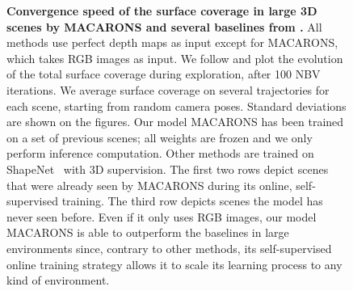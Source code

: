 \begin{figure}
  \caption{{\bf Convergence speed of the surface coverage in large 3D scenes by MACARONS and several baselines from \cite{guedon-nips22-scone-surface-coverage}.} All methods use perfect depth maps as input except for MACARONS, which takes RGB images as input. We follow \cite{guedon-nips22-scone-surface-coverage} and plot the evolution of the total surface coverage during exploration, after 100 NBV iterations. We average surface coverage on several trajectories for each scene, starting from random camera poses. Standard deviations are shown on the figures. Our model MACARONS has been trained on a set of previous scenes; all weights are frozen and we only perform inference computation. Other methods are trained on ShapeNet~\cite{chang-15-shapenet} with 3D supervision. The first two rows depict scenes that were already seen by MACARONS during its online, self-supervised training. The third row depicts scenes the model has never seen before. Even if it only uses RGB images, our model MACARONS is able to outperform the baselines in large environments since, contrary to other methods, its self-supervised online training strategy allows it to scale its learning process to any kind of environment.
  }
  \label{fig:coverage_evolution}
\end{figure}